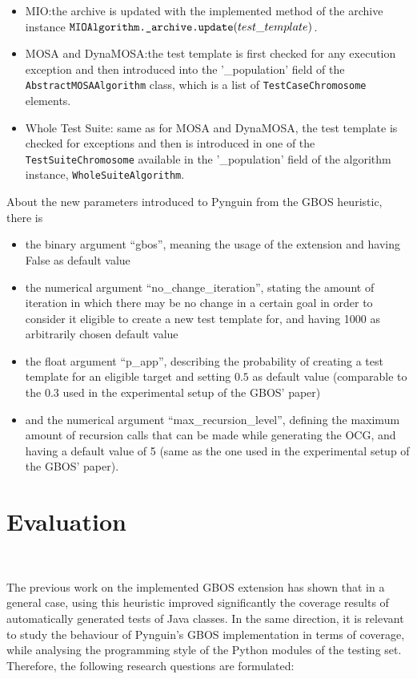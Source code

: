 \documentclass[%
  chapterprefix=false,%
  open=right,%
  twoside=true,%
  paper=a4,%
  logofile={Figures/logo.png},%
  thesistype=master,%
  UKenglish,%
]{se2thesis}
\newcommand{\classname}[1]{\texttt{#1}}
\newcommand{\callable}[2][]{\(\text{\texttt{#2}}(#1)\)}
\begin{document}
\begin{itemize}
  \item MIO:\@ the archive is updated with the implemented method of the archive instance \callable[test\_template]{MIOAlgorithm.\_archive.update}.
  \item MOSA and DynaMOSA:\@ the test template is first checked for any execution exception and then introduced into the '\_population' field of the \classname{AbstractMOSAAlgorithm} class, which is a list of \classname{TestCaseChromosome} elements.
  \item Whole Test Suite: same as for MOSA and DynaMOSA, the test template is checked for exceptions and then is introduced in one of the \classname{TestSuiteChromosome} available in the '\_population' field of the algorithm instance, \classname{WholeSuiteAlgorithm}.
\end{itemize}

About the new parameters introduced to Pynguin from the GBOS heuristic, there is
\begin{itemize}
  \item the binary argument ``gbos'', meaning the usage of the extension and having False as default value
  \item the numerical argument ``no\_change\_iteration'', stating the amount of iteration in which there may be no change in a certain goal in order to consider it eligible to create a new test template for, and having 1000 as arbitrarily chosen default value
  \item the float argument ``p\_app'', describing the probability of creating a test template for an eligible target and setting \(0.5\) as default value (comparable to the \(0.3\) used in the experimental setup of the GBOS' paper)
  \item and the numerical argument ``max\_recursion\_level'', defining the maximum amount of recursion calls that can be made while generating the OCG, and having a default value of 5 (same as the one used in the experimental setup of the GBOS' paper).
\end{itemize}

\chapter{Evaluation}~\label{chap:evaluation}

The previous work on the implemented GBOS extension has shown that in a general case, using this heuristic improved significantly the coverage results of automatically generated tests of Java classes.
In the same direction, it is relevant to study the behaviour of Pynguin's GBOS implementation in terms of coverage, while analysing the programming style of the Python modules of the testing set.
Therefore, the following research questions are formulated:
\end{document}

